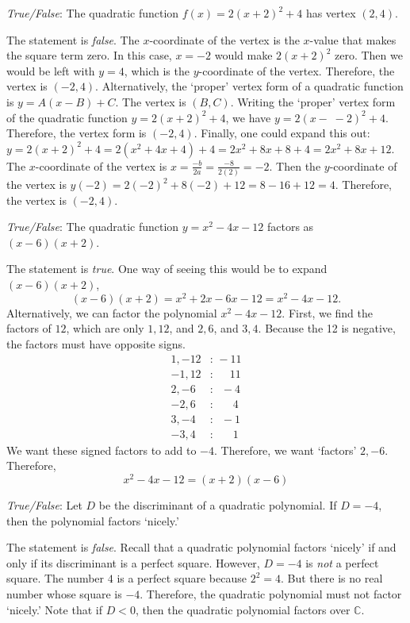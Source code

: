 \documentclass[11pt,letterpaper]{article}
\begin{document}
\quizsol \textit{True/False}: The quadratic function $f(x)= 2(x + 2)^2 + 4$ has vertex $(2, 4)$. \pspace

\sol The statement is \textit{false}. The $x$-coordinate of the vertex is the $x$-value that makes the square term zero. In this case, $x= -2$ would make $2(x + 2)^2$ zero. Then we would be left with $y= 4$, which is the $y$-coordinate of the vertex. Therefore, the vertex is $(-2, 4)$. Alternatively, the `proper' vertex form of a quadratic function is $y= A(x - B) + C$. The vertex is $(B, C)$. Writing the `proper' vertex form of the quadratic function $y= 2(x + 2)^2 + 4$, we have $y= 2(x - \;-2)^2 + 4$. Therefore, the vertex form is $(-2, 4)$. Finally, one could expand this out: $y= 2(x + 2)^2 + 4= 2(x^2 + 4x + 4) + 4= 2x^2 + 8x + 8 + 4= 2x^2 + 8x + 12$. The $x$-coordinate of the vertex is $x= \frac{-b}{2a}= \frac{-8}{2(2)}= -2$. Then the $y$-coordinate of the vertex is $y(-2)= 2(-2)^2 + 8(-2) + 12= 8 - 16 + 12= 4$. Therefore, the vertex is $(-2, 4)$. \pvspace{1.3cm}



\quizsol \textit{True/False}: The quadratic function $y= x^2 - 4x - 12$ factors as $(x - 6)(x + 2)$. \pspace

\sol \sol The statement is \textit{true}. One way of seeing this would be to expand $(x - 6)(x + 2)$,
	\[
	(x - 6)(x + 2)= x^2 + 2x - 6x - 12= x^2 - 4x - 12.
	\]
Alternatively, we can factor the polynomial $x^2 - 4x - 12$. First, we find the factors of $12$, which are only $1, 12$, and $2, 6$, and $3, 4$. Because the 12 is negative, the factors must have opposite signs. 
	\[
	\begin{aligned}
	1, -12&\colon \,-11 \\
	-1, 12&\colon \phantom{-..}11 \\
	2, -6&\colon \;\;-\!4 \\
	-2, 6&\colon \;\phantom{-..}4 \\
	3, -4&\colon \;\;-\!1 \\
	-3, 4&\colon \;\phantom{-..}1
	\end{aligned}
	\]
We want these signed factors to add to $-4$. Therefore, we want `factors' $2, -6$. Therefore, 
	\[
	x^2 - 4x - 12= (x + 2)(x - 6)
	\] \pvspace{1.3cm}



\quizsol \textit{True/False}: Let $D$ be the discriminant of a quadratic polynomial. If $D= -4$, then the polynomial factors `nicely.' \pspace

\sol The statement is \textit{false}. Recall that a quadratic polynomial factors `nicely' if and only if its discriminant is a perfect square. However, $D= -4$ is \textit{not} a perfect square. The number $4$ is a perfect square because $2^2= 4$. But there is no real number whose square is $-4$. Therefore, the quadratic polynomial must not factor `nicely.' Note that if $D < 0$, then the quadratic polynomial factors over $\mathbb{C}$. \pvspace{1.3cm}
\end{document}
